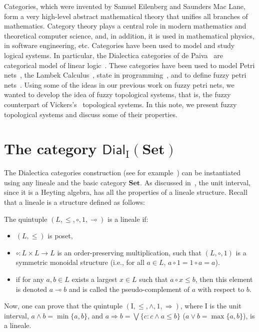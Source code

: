 \documentclass[11pt]{article}
\newenvironment{definition}[1][Definition]{\begin{trivlist}
\item[\hskip \labelsep {\bfseries #1}]}{\end{trivlist}}
\begin{document}
Categories, which were invented by Samuel Eilenberg and Saunders Mac Lane, form a very 
high-level abstract mathematical theory that unifies all branches of mathematics.
Category theory plays a central role in modern mathematics and 
theoretical computer science, and, in addition,  it is used in mathematical 
physics, in  software engineering, etc. Categories have been used to model and
study logical systems. In particular, the Dialectica categories of de Paiva~\cite{paiva89} 
are categorical model of linear logic~\cite{girard95}. These categories have been used
to model Petri nets~\cite{brown90}, the Lambek Calculus~\cite{paiva90}, 
state in programming~\cite{correaetal96}, and to define fuzzy petri 
nets~\cite{paivasyropoulos11}. Using some of the ideas in our previous work on 
fuzzy petri nets, we wanted to develop the idea of fuzzy topological systems, that is, 
the fuzzy counterpart of Vickers's~\cite{vickers90} topological systems. In this note, 
we present fuzzy topological systems and discuss some of their properties. 

\section{The category $\mathsf{Dial}_{\mathrm{I}}(\mathbf{Set})$}\label{basic:notions}
The Dialectica categories construction (see for example~\cite{paiva06}) can be  
instantiated using any lineale  and the basic category $\mathbf{Set}$.  As discussed 
in~\cite{syropoulos06}, the unit interval, since it is a Heyting algebra, has all the 
properties of a lineale structure. Recall that a lineale is a structure defined as follows:
\begin{definition}
The quintuple $(L, \le, \circ, 1, \multimap)$ is a lineale if:
\begin{itemize}
\item $(L,\le)$ is poset,
\item $\circ:L\times L\rightarrow L$ is an order-preserving multiplication,
      such that $(L,\circ, 1)$ is a symmetric monoidal structure (i.e.,
      for all $a\in L$, $a\circ 1=1\circ a=a$).
\item if for any $a, b\in L$ exists a largest $x\in L$ such that 
      $a\circ x\le b$, then this element is denoted $a\multimap b$ and
      is called the pseudo-complement of $a$ with respect to $b$.
\end{itemize}
\end{definition}
Now, one can prove that the quintuple 
$(\mathrm{I}, \le, \wedge, 1, \Rightarrow)$, where $\mathrm{I}$ is the unit interval, 
$a\wedge b=\min\{a,b\}$, and  $a\Rightarrow b=\bigvee\{c: c\wedge a\le b\}$ 
($a\vee b=\max\{a,b\}$),  is a lineale.
\end{document}
